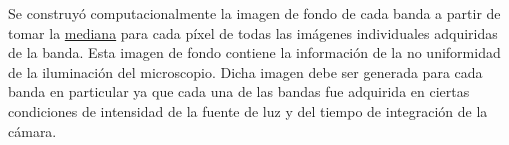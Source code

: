\hspace{0.5cm}Se construyó computacionalmente la imagen de fondo de cada banda a partir de tomar la \underline{mediana} para cada píxel de todas las imágenes individuales adquiridas de la banda. Esta imagen de fondo contiene la información de la no uniformidad de la iluminación del microscopio. Dicha imagen debe ser generada para cada banda en particular ya que cada una de las bandas fue adquirida en ciertas condiciones de intensidad de la fuente de luz y del tiempo de integración de la cámara. 
	\begin{figure}[H]
		\begin{floatrow}

\end{floatrow}
\end{figure}
